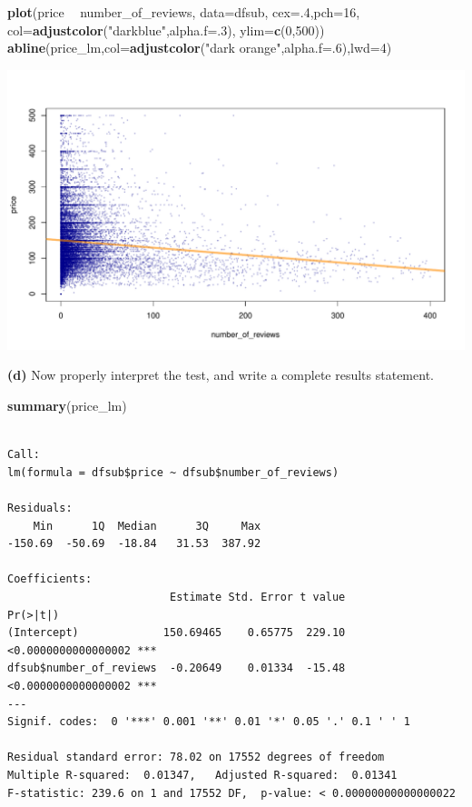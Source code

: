 \documentclass[
]{book}
\newenvironment{Shaded}{\begin{snugshade}}{\end{snugshade}}
\newcommand{\DataTypeTok}[1]{\textcolor[rgb]{0.13,0.29,0.53}{#1}}
\newcommand{\DecValTok}[1]{\textcolor[rgb]{0.00,0.00,0.81}{#1}}
\newcommand{\KeywordTok}[1]{\textcolor[rgb]{0.13,0.29,0.53}{\textbf{#1}}}
\newcommand{\NormalTok}[1]{#1}
\newcommand{\OperatorTok}[1]{\textcolor[rgb]{0.81,0.36,0.00}{\textbf{#1}}}
\newcommand{\StringTok}[1]{\textcolor[rgb]{0.31,0.60,0.02}{#1}}
\begin{document}
\begin{Shaded}
\begin{Highlighting}[]
\KeywordTok{plot}\NormalTok{(price }\OperatorTok{~}\StringTok{ }\NormalTok{number_of_reviews,}
     \DataTypeTok{data=}\NormalTok{dfsub,}
     \DataTypeTok{cex=}\NormalTok{.}\DecValTok{4}\NormalTok{,}\DataTypeTok{pch=}\DecValTok{16}\NormalTok{,}
     \DataTypeTok{col=}\KeywordTok{adjustcolor}\NormalTok{(}\StringTok{"darkblue"}\NormalTok{,}\DataTypeTok{alpha.f=}\NormalTok{.}\DecValTok{3}\NormalTok{),}
     \DataTypeTok{ylim=}\KeywordTok{c}\NormalTok{(}\DecValTok{0}\NormalTok{,}\DecValTok{500}\NormalTok{))}
\KeywordTok{abline}\NormalTok{(price_lm,}\DataTypeTok{col=}\KeywordTok{adjustcolor}\NormalTok{(}\StringTok{"dark orange"}\NormalTok{,}\DataTypeTok{alpha.f=}\NormalTok{.}\DecValTok{6}\NormalTok{),}\DataTypeTok{lwd=}\DecValTok{4}\NormalTok{)}
\end{Highlighting}
\end{Shaded}

\includegraphics{figures/unnamed-chunk-202-1.pdf}

\textbf{(d)} Now properly interpret the test, and write a complete results statement.

\begin{Shaded}
\begin{Highlighting}[]
\KeywordTok{summary}\NormalTok{(price_lm)}
\end{Highlighting}
\end{Shaded}

\begin{verbatim}

Call:
lm(formula = dfsub$price ~ dfsub$number_of_reviews)

Residuals:
    Min      1Q  Median      3Q     Max 
-150.69  -50.69  -18.84   31.53  387.92 

Coefficients:
                         Estimate Std. Error t value            Pr(>|t|)    
(Intercept)             150.69465    0.65775  229.10 <0.0000000000000002 ***
dfsub$number_of_reviews  -0.20649    0.01334  -15.48 <0.0000000000000002 ***
---
Signif. codes:  0 '***' 0.001 '**' 0.01 '*' 0.05 '.' 0.1 ' ' 1

Residual standard error: 78.02 on 17552 degrees of freedom
Multiple R-squared:  0.01347,   Adjusted R-squared:  0.01341 
F-statistic: 239.6 on 1 and 17552 DF,  p-value: < 0.00000000000000022
\end{verbatim}
\end{document}
